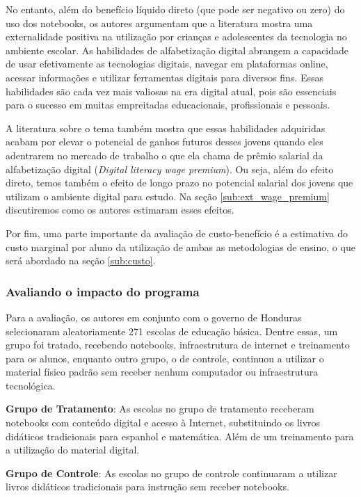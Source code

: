 \documentclass[12pt,letterpaper]{article}
\newcommand{\1}{\mathbbm{1}}
\numberwithin{equation}{section}
\begin{document}
No entanto, além do benefício líquido direto (que pode ser negativo ou zero) do uso dos notebooks, os autores argumentam que a literatura mostra uma externalidade positiva na utilização por crianças e adolescentes da tecnologia no ambiente escolar. As habilidades de alfabetização digital abrangem a capacidade de usar efetivamente as tecnologias digitais, navegar em plataformas online, acessar informações e utilizar ferramentas digitais para diversos fins. Essas habilidades são cada vez mais valiosas na era digital atual, pois são essenciais para o sucesso em muitas empreitadas educacionais, profissionais e pessoais.

A literatura sobre o tema também mostra que essas habilidades adquiridas acabam por elevar o potencial de ganhos futuros desses jovens quando eles adentrarem no mercado de trabalho o que ela chama de prêmio salarial da alfabetização digital (\textit{Digital literacy wage premium}). Ou seja, além do efeito direto, temos também o efeito de longo prazo no potencial salarial dos jovens que utilizam o ambiente digital para estudo. Na seção \ref{sub:ext_wage_premium} discutiremos como os autores estimaram esses efeitos.

Por fim, uma parte importante da avaliação de custo-benefício é a estimativa do custo marginal por aluno da utilização de ambas as metodologias de ensino, o que será abordado na seção \ref{sub:custo}.

\subsubsection{Avaliando o impacto do programa} \label{sub:ava_imp}

Para a avaliação, os autores em conjunto com o governo de Honduras selecionaram aleatoriamente 271 escolas de educação básica. Dentre essas, um grupo foi tratado, recebendo notebooks, infraestrutura de internet e treinamento para os alunos, enquanto outro grupo, o de controle, continuou a utilizar o material físico padrão sem receber nenhum computador ou infraestrutura tecnológica.

\vspace{5mm}

\begin{tcolorbox}[colback=gray!10,colframe=gray!50!black]

    \textbf{Grupo de Tratamento}: As escolas no grupo de tratamento receberam notebooks com conteúdo digital e acesso à Internet, substituindo os livros didáticos tradicionais para espanhol e matemática. Além de um treinamento para a utilização do material digital.
    
    \textbf{Grupo de Controle}: As escolas no grupo de controle continuaram a utilizar livros didáticos tradicionais para instrução sem receber notebooks.
\end{tcolorbox}
\end{document}
